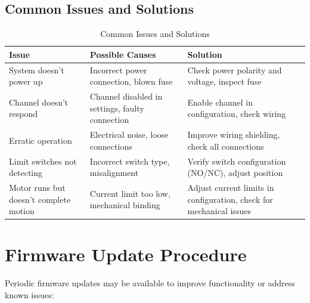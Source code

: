 \documentclass[12pt,a4paper,twoside,openright]{book}
\newcommand{\tabletextfont}{\normalfont\rmfamily}
\newcommand{\tableheadfont}{\normalfont\bfseries}
\begin{document}
\subsection{Common Issues and Solutions}

\begin{table}[h]
\centering
\setlength{\tabcolsep}{5pt} %
\begin{tabular}{|p{}|p{}|p{}|}
\hline
\tableheadfont\textbf{Issue} & \tableheadfont\textbf{Possible Causes} & \tableheadfont\textbf{Solution} \\
\hline
\tabletextfont System doesn't power up & Incorrect power connection, blown fuse & Check power polarity and voltage, inspect fuse \\
\hline
\tabletextfont Channel doesn't respond & Channel disabled in settings, faulty connection & Enable channel in configuration, check wiring \\
\hline
\tabletextfont Erratic operation & Electrical noise, loose connections & Improve wiring shielding, check all connections \\
\hline
\tabletextfont Limit switches not detecting & Incorrect switch type, misalignment & Verify switch configuration (NO/NC), adjust position \\
\hline
\tabletextfont Motor runs but doesn't complete motion & Current limit too low, mechanical binding & Adjust current limits in configuration, check for mechanical issues \\
\hline
\end{tabular}
\caption{Common Issues and Solutions}
\end{table}

\section{Firmware Update Procedure}

Periodic firmware updates may be available to improve functionality or address known issues:
\end{document}
